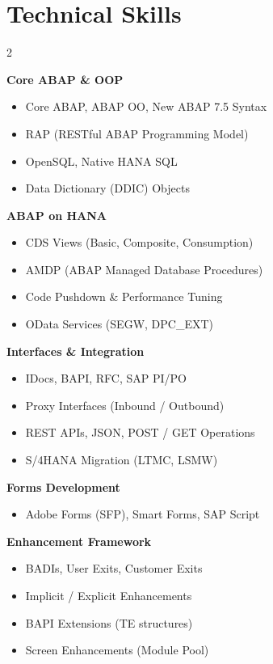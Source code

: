 \documentclass[10pt, a4paper]{article}
\begin{document}
\section{Technical Skills}

\setlength{\columnsep}{2em}
\begin{paracol}{2}

  \textbf{Core ABAP \& OOP}
  \begin{itemize}
    \item Core ABAP, ABAP OO, New ABAP 7.5 Syntax
    \item RAP (RESTful ABAP Programming Model)
    \item OpenSQL, Native HANA SQL
    \item Data Dictionary (DDIC) Objects
  \end{itemize}

  \textbf{ABAP on HANA}
  \begin{itemize}
    \item CDS Views (Basic, Composite, Consumption)
    \item AMDP (ABAP Managed Database Procedures)
    \item Code Pushdown \& Performance Tuning
    \item OData Services (SEGW, DPC\_EXT)
  \end{itemize}

  \textbf{Interfaces \& Integration}
  \begin{itemize}
    \item IDocs, BAPI, RFC, SAP PI/PO
    \item Proxy Interfaces (Inbound / Outbound)
    \item REST APIs, JSON, POST / GET Operations
    \item S/4HANA Migration (LTMC, LSMW)
  \end{itemize}

  \textbf{Forms Development}
  \begin{itemize}
    \item Adobe Forms (SFP), Smart Forms, SAP Script
  \end{itemize}

  \switchcolumn

  \textbf{Enhancement Framework}
  \begin{itemize}
    \item BADIs, User Exits, Customer Exits
    \item Implicit / Explicit Enhancements
    \item BAPI Extensions (TE structures)
    \item Screen Enhancements (Module Pool)
  \end{itemize}


\end{paracol}
\end{document}
